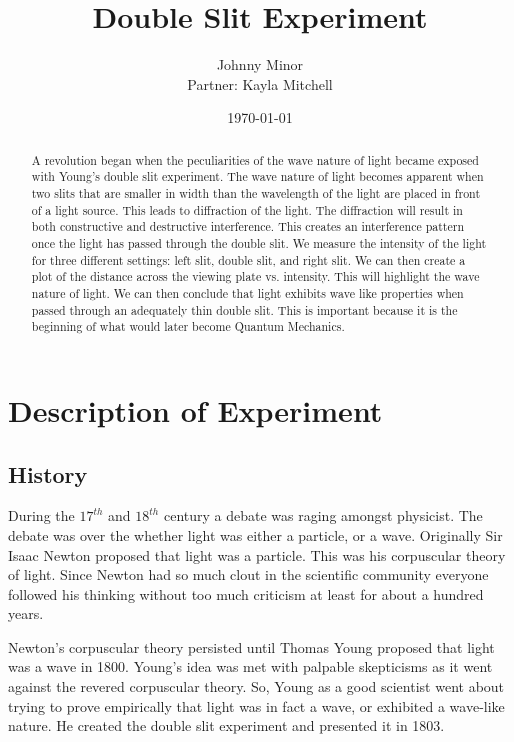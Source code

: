 \documentclass[12pt letterpaper]{article}
\title{Double Slit Experiment}
\author{Johnny Minor \\ Partner: Kayla Mitchell}
\date{\today}
\begin{document}
\maketitle

\begin{abstract}
A revolution began when the peculiarities of the wave nature of light became exposed with Young's double slit experiment. The wave nature of light becomes apparent when two slits that are smaller in width than the wavelength of the light are placed in front of a light source. This leads to diffraction of the light. The diffraction will result in both constructive and destructive interference. This creates an interference pattern once the light has passed through the double slit. We measure the intensity of the light for three different settings: left slit, double slit, and right slit. We can then create a plot of the distance across the viewing plate vs. intensity. This will highlight the wave nature of light. We can then conclude that light exhibits wave like properties when passed through an adequately thin double slit. This is important because it is the beginning of what would later become Quantum Mechanics. 

\end{abstract}

\newpage

\section*{Description of Experiment}

\subsection*{History}

During the $17^{th}$ and $18^{th}$ century a debate was raging amongst physicist. The debate was over the whether light was either a particle, or a wave. Originally Sir Isaac Newton proposed that light was a particle. This was his corpuscular theory of light. Since Newton had so much clout in the scientific community everyone followed his thinking without too much criticism at least for about a hundred years. 

Newton's corpuscular theory persisted until Thomas Young proposed that light was a wave in 1800. Young's idea was met with palpable skepticisms as it went against the revered corpuscular theory. So, Young as a good scientist went about trying to prove empirically that light was in fact a wave, or exhibited a wave-like nature. He created the double slit experiment and presented it in 1803. 
\end{document}
